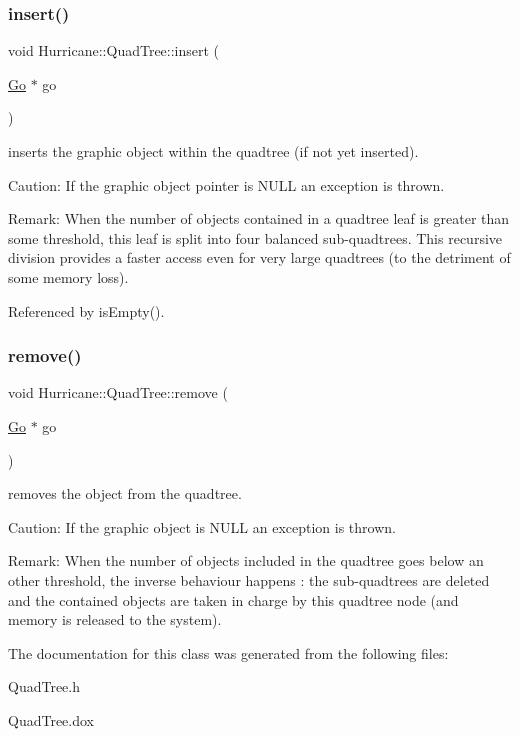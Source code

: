 \subsubsection{\texorpdfstring{insert()}{insert()}}
{\footnotesize\ttfamily void Hurricane\+::\+Quad\+Tree\+::insert (\begin{DoxyParamCaption}\item[{\hyperlink{classHurricane_1_1Go}{Go} $\ast$}]{go }\end{DoxyParamCaption})}

inserts the graphic object within the quadtree (if not yet inserted).

\begin{DoxyParagraph}{Caution\+:}
If the graphic object pointer is N\+U\+LL an exception is thrown.
\end{DoxyParagraph}
\begin{DoxyParagraph}{Remark\+:}
When the number of objects contained in a quadtree leaf is greater than some threshold, this leaf is split into four balanced sub-\/quadtrees. This recursive division provides a faster access even for very large quadtrees (to the detriment of some memory loss). 
\end{DoxyParagraph}


Referenced by is\+Empty().

\mbox{\label{classHurricane_1_1QuadTree_af646d2864c70f6456d845c2d6a8d1785}} 
\subsubsection{\texorpdfstring{remove()}{remove()}}
{\footnotesize\ttfamily void Hurricane\+::\+Quad\+Tree\+::remove (\begin{DoxyParamCaption}\item[{\hyperlink{classHurricane_1_1Go}{Go} $\ast$}]{go }\end{DoxyParamCaption})}

removes the object from the quadtree.

\begin{DoxyParagraph}{Caution\+:}
If the graphic object is N\+U\+LL an exception is thrown.
\end{DoxyParagraph}
\begin{DoxyParagraph}{Remark\+:}
When the number of objects included in the quadtree goes below an other threshold, the inverse behaviour happens \+: the sub-\/quadtrees are deleted and the contained objects are taken in charge by this quadtree node (and memory is released to the system). 
\end{DoxyParagraph}


The documentation for this class was generated from the following files\+:\begin{DoxyCompactItemize}
\item 
Quad\+Tree.\+h\item 
Quad\+Tree.\+dox\end{DoxyCompactItemize}
